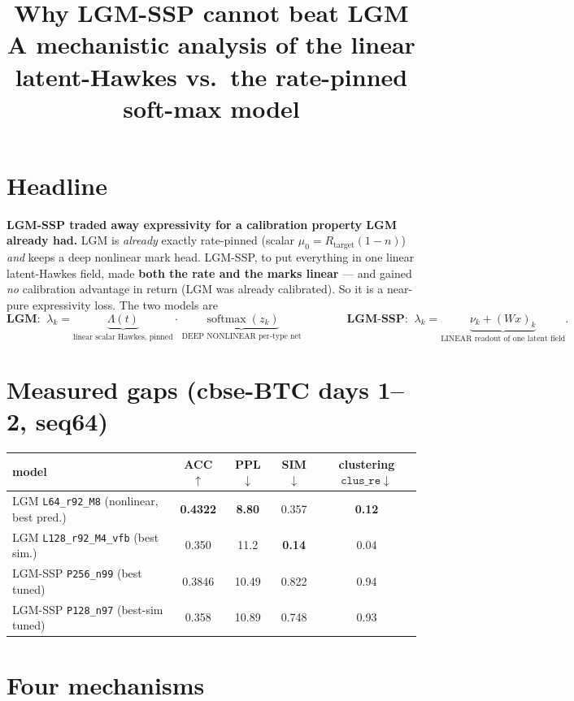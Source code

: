 \documentclass[11pt]{article}
\title{\textbf{Why LGM-SSP cannot beat LGM}\\[2pt]
\large A mechanistic analysis of the linear latent-Hawkes vs.\ the rate-pinned soft-max model}
\author{}\date{}
\newcommand{\Lam}{\Lambda}
\begin{document}
\maketitle\vspace{-3em}

\section{Headline}
\textbf{LGM-SSP traded away expressivity for a calibration property LGM already had.}
LGM is \emph{already} exactly rate-pinned (scalar $\mu_0=R_{\mathrm{target}}(1-n)$) \emph{and} keeps a
deep nonlinear mark head. LGM-SSP, to put everything in one linear latent-Hawkes field, made
\textbf{both the rate and the marks linear} --- and gained \emph{no} calibration advantage in return
(LGM was already calibrated). So it is a near-pure expressivity loss. The two models are
\[
\textbf{LGM: }\ \lambda_k=\underbrace{\Lam(t)}_{\text{linear scalar Hawkes, pinned}}\!\cdot\,
\underbrace{\operatorname{softmax}(z_k)}_{\text{DEEP NONLINEAR per-type net}}
\qquad\qquad
\textbf{LGM-SSP: }\ \lambda_k=\underbrace{\nu_k+(Wx)_k}_{\text{LINEAR readout of one latent field}} .
\]

\section{Measured gaps (cbse-BTC days 1--2, seq64)}
\begin{center}\small\renewcommand{\arraystretch}{1.2}
\begin{tabular}{lcccc}
\toprule
model & ACC $\uparrow$ & PPL $\downarrow$ & SIM $\downarrow$ & clustering $\mathtt{clus\_re}\downarrow$\\
\midrule
LGM \texttt{L64\_r92\_M8} (nonlinear, best pred.) & \textbf{0.4322} & \textbf{8.80} & 0.357 & \textbf{0.12}\\
LGM \texttt{L128\_r92\_M4\_vfb} (best sim.) & 0.350 & 11.2 & \textbf{0.14} & 0.04\\
LGM-SSP \texttt{P256\_n99} (best tuned) & 0.3846 & 10.49 & 0.822 & 0.94\\
LGM-SSP \texttt{P128\_n97} (best-sim tuned) & 0.358 & 10.89 & 0.748 & 0.93\\
\bottomrule
\end{tabular}
\end{center}

\section{Four mechanisms}
\end{document}
